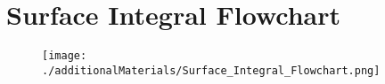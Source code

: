 \section{Surface Integral Flowchart}

\begin{figure}[H]
	\centering
	\hspace*{-1.5in}
	\texttt{[image: ./additionalMaterials/Surface\_Integral\_Flowchart.png]}
\end{figure}

\pagebreak
